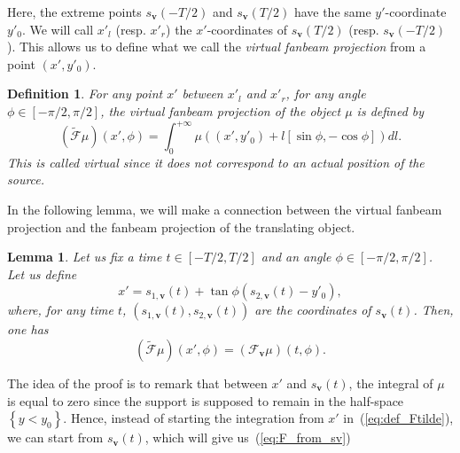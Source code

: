 \documentclass[9pt,technote]{IEEEtran}
\numberwithin{equation}{section}
\newcommand{\bv}{\mathbf{v}}
\newcommand{\Tbv}{\mathcal{F}_{\mathbf{v}}}
\newcommand{\sbv}{s_{\mathbf{v}}}
\newtheorem{definition}{Definition}
\newtheorem{lemma}{Lemma}
\begin{document}
Here, the extreme points $\sbv(-T/2)$ and $\sbv(T/2)$ have the same $y'$-coordinate $y'_0$. We will call $x'_l$ (resp. $x'_r$) the $x'$-coordinates of $\sbv(T/2)$ (resp. $\sbv(-T/2)$). This allows us to define what we call the \emph{virtual fanbeam projection} from a point $(x',y'_0)$.
\begin{definition}
	For any point $x'$ between $x'_l$ and $x'_r$, for any angle $\phi \in \left[ -\pi/2, \pi/2\right]$, the \emph{virtual fanbeam projection} of the object $\mu$ is defined by
\begin{equation}
	\left( \tilde{\mathcal{F}}\mu	\right)(x',\phi) = \int_0^{+\infty} \mu \left( (x',y'_0) + l \left[ \sin \phi, -\cos \phi \right] \right) dl.
\label{eq:def_Ftilde}
\end{equation}
This is called \emph{virtual} since it does not correspond to an actual position of the source.
\end{definition}

In the following lemma, we will make a connection between the virtual fanbeam projection and the fanbeam projection of the translating object.
\begin{lemma}
	Let us fix a time $t \in \left[ -T/2, T/2\right]$ and an angle $\phi \in \left[ -\pi/2, \pi/2\right]$. Let us define
	\begin{equation}
		x' = s_{1,\bv}(t) + \tan \phi \left( s_{2,\bv}(t) - y'_0 \right),
	\end{equation}
	where, for any time $t$, $\left( s_{1,\bv}(t), s_{2,\bv}(t) \right)$ are the coordinates of $\sbv(t)$.
	Then, one has
	\begin{equation}
		\left( \tilde{\mathcal{F}}\mu \right)(x',\phi) = \left( \Tbv \mu \right)(t,\phi).
	\end{equation}
\label{lem:T_x_t}
\end{lemma}
The idea of the proof is to remark that between $x'$ and $\sbv(t)$, the integral of $\mu$ is equal to zero since the support is supposed to remain in the half-space $\left\{ y<y_0 \right\}$. Hence, instead of starting the integration from $x'$ in~(\ref{eq:def_Ftilde}), we can start from $\sbv(t)$, which will give us~(\ref{eq:F_from_sv})
\end{document}
